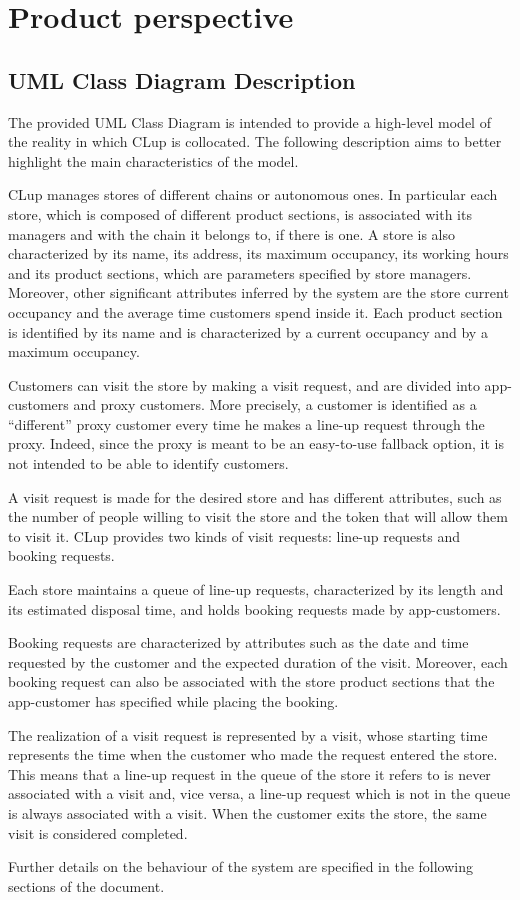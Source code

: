 \documentclass[a4paper,oneside,11pt]{book}   %
\begin{document}
    \section{Product perspective}
    \subsection{UML Class Diagram Description}
    The provided UML Class Diagram is intended to provide a high-level model of the reality in which CLup is collocated. The following description aims to better highlight the main characteristics of the model. \par
    CLup manages stores of different chains or autonomous ones. In particular each store, which is composed of different product sections, is associated with its managers and with the chain it belongs to, if there is one. A store is also characterized by its name, its address, its maximum occupancy, its working hours and its product sections, which are parameters specified by store managers. Moreover, other significant attributes inferred by the system are the store current occupancy and the average time customers spend inside it. Each product section is identified by its name and is characterized by a current occupancy and by a maximum occupancy. \par
    Customers can visit the store by making a visit request, and are divided into app-customers and proxy customers. More precisely, a customer is identified as a “different” proxy customer every time he makes a line-up request through the proxy. Indeed, since the proxy is meant to be an easy-to-use fallback option, it is not intended to be able to identify customers. \par
    A visit request is made for the desired store and has different attributes, such as the number of people willing to visit the store and the token that will allow them to visit it. CLup provides two kinds of visit requests: line-up requests and booking requests. \par
    Each store maintains a queue of line-up requests, characterized by its length and its estimated disposal time, and holds booking requests made by app-customers. \par
    Booking requests are characterized by attributes such as the date and time requested by the customer and the expected duration of the visit. Moreover, each booking request can also be associated with the store product sections that the app-customer has specified while placing the booking. \par
    The realization of a visit request is represented by a visit, whose starting time represents the time when the customer who made the request entered the store. This means that a line-up request in the queue of the store it refers to is never associated with a visit and, vice versa, a line-up request which is not in the queue is always associated with a visit. When the customer exits the store, the same visit is considered completed. \par
    Further details on the behaviour of the system are specified in the following sections of the document.
\end{document}
